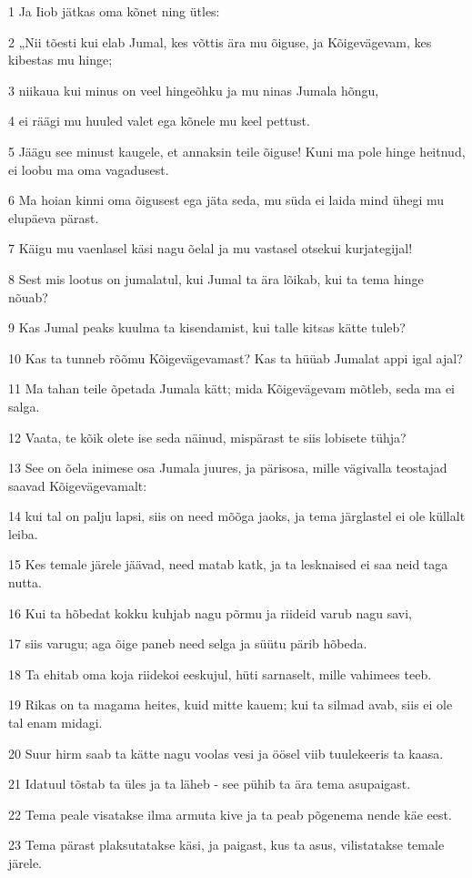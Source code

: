 \par 1 Ja Iiob jätkas oma kõnet ning ütles:
\par 2 „Nii tõesti kui elab Jumal, kes võttis ära mu õiguse, ja Kõigevägevam, kes kibestas mu hinge;
\par 3 niikaua kui minus on veel hingeõhku ja mu ninas Jumala hõngu,
\par 4 ei räägi mu huuled valet ega kõnele mu keel pettust.
\par 5 Jäägu see minust kaugele, et annaksin teile õiguse! Kuni ma pole hinge heitnud, ei loobu ma oma vagadusest.
\par 6 Ma hoian kinni oma õigusest ega jäta seda, mu süda ei laida mind ühegi mu elupäeva pärast.
\par 7 Käigu mu vaenlasel käsi nagu õelal ja mu vastasel otsekui kurjategijal!
\par 8 Sest mis lootus on jumalatul, kui Jumal ta ära lõikab, kui ta tema hinge nõuab?
\par 9 Kas Jumal peaks kuulma ta kisendamist, kui talle kitsas kätte tuleb?
\par 10 Kas ta tunneb rõõmu Kõigevägevamast? Kas ta hüüab Jumalat appi igal ajal?
\par 11 Ma tahan teile õpetada Jumala kätt; mida Kõigevägevam mõtleb, seda ma ei salga.
\par 12 Vaata, te kõik olete ise seda näinud, mispärast te siis lobisete tühja?
\par 13 See on õela inimese osa Jumala juures, ja pärisosa, mille vägivalla teostajad saavad Kõigevägevamalt:
\par 14 kui tal on palju lapsi, siis on need mõõga jaoks, ja tema järglastel ei ole küllalt leiba.
\par 15 Kes temale järele jäävad, need matab katk, ja ta lesknaised ei saa neid taga nutta.
\par 16 Kui ta hõbedat kokku kuhjab nagu põrmu ja riideid varub nagu savi,
\par 17 siis varugu; aga õige paneb need selga ja süütu pärib hõbeda.
\par 18 Ta ehitab oma koja riidekoi eeskujul, hüti sarnaselt, mille vahimees teeb.
\par 19 Rikas on ta magama heites, kuid mitte kauem; kui ta silmad avab, siis ei ole tal enam midagi.
\par 20 Suur hirm saab ta kätte nagu voolas vesi ja öösel viib tuulekeeris ta kaasa.
\par 21 Idatuul tõstab ta üles ja ta läheb - see pühib ta ära tema asupaigast.
\par 22 Tema peale visatakse ilma armuta kive ja ta peab põgenema nende käe eest.
\par 23 Tema pärast plaksutatakse käsi, ja paigast, kus ta asus, vilistatakse temale järele.

